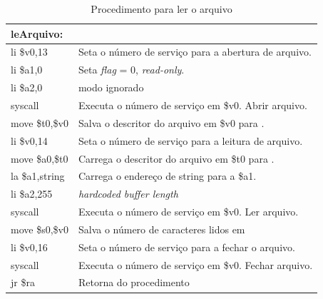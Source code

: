 \documentclass[12pt,a4paper]{article}
\numberwithin{figure}{subsection}
\numberwithin{table}{subsection}
\begin{document}
\begin{table}[H]
	\renewcommand{\arraystretch}{1.2}
	\centering
	\caption*{Procedimento para ler o arquivo}
	\label{q2cod:lefile}
	\begin{tabular}{>{\ttfamily}p{4cm} p{11cm}}
		\toprule
		leArquivo:       & \\
		\midrule[0.01cm]
		li \$v0,13       & Seta o número de serviço para a abertura de arquivo.  \\
		li \$a1,0        & Seta \textit{flag} = 0, \textit{read-only}. \\
		li \$a2,0        & modo ignorado \\
		syscall          & Executa o número de serviço em {\ttfamily \$v0}. Abrir arquivo. \\
		move \$t0,\$v0   & Salva o descritor do arquivo em {\ttfamily \$v0} para \ttfamily{\$t0}. \\
		\midrule[0.01cm]
		li \$v0,14       & Seta o número de serviço para a leitura de arquivo. \\
		move \$a0,\$t0   & Carrega o descritor do arquivo em {\ttfamily \$t0} para \ttfamily{\$a0}. \\
		la \$a1,string   & Carrega o endereço de {\ttfamily string} para a {\ttfamily \$a1}. \\
		li \$a2,255      & \textit{hardcoded buffer length} \\
		syscall          & Executa o número de serviço em {\ttfamily \$v0}. Ler arquivo. \\
		move \$s0,\$v0   & Salva o número de caracteres lidos em \ttfamily{\$s0} \\
		\midrule[0.01cm]
		li \$v0,16       & Seta o número de serviço para a fechar o arquivo. \\
		syscall          & Executa o número de serviço em {\ttfamily \$v0}. Fechar arquivo. \\
		\midrule[0.01cm]
		jr \$ra          & Retorna do procedimento \\
		\bottomrule
	\end{tabular}
\end{table}
\end{document}
